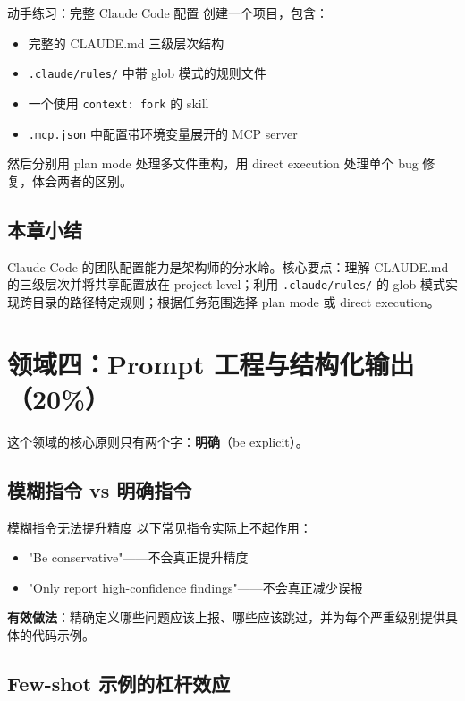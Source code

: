 \documentclass[a4paper]{article}
\begin{document}
\begin{knowledgebox}{动手练习：完整 Claude Code 配置}
创建一个项目，包含：
\begin{itemize}[leftmargin=1.5em]
    \item 完整的 CLAUDE.md 三级层次结构
    \item \texttt{.claude/rules/} 中带 glob 模式的规则文件
    \item 一个使用 \texttt{context: fork} 的 skill
    \item \texttt{.mcp.json} 中配置带环境变量展开的 MCP server
\end{itemize}
然后分别用 plan mode 处理多文件重构，用 direct execution 处理单个 bug 修复，体会两者的区别。
\end{knowledgebox}

\subsection{本章小结}

Claude Code 的团队配置能力是架构师的分水岭。核心要点：理解 CLAUDE.md 的三级层次并将共享配置放在 project-level；利用 \texttt{.claude/rules/} 的 glob 模式实现跨目录的路径特定规则；根据任务范围选择 plan mode 或 direct execution。

\section{领域四：Prompt 工程与结构化输出（20\%）}

这个领域的核心原则只有两个字：\textbf{明确}（be explicit）。

\subsection{模糊指令 vs 明确指令}

\begin{warningbox}{模糊指令无法提升精度}
以下常见指令实际上不起作用：
\begin{itemize}[leftmargin=1.5em]
    \item "Be conservative"——不会真正提升精度
    \item "Only report high-confidence findings"——不会真正减少误报
\end{itemize}
\textbf{有效做法}：精确定义哪些问题应该上报、哪些应该跳过，并为每个严重级别提供具体的代码示例。
\end{warningbox}

\subsection{Few-shot 示例的杠杆效应}
\end{document}
